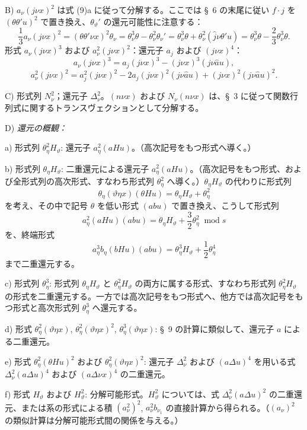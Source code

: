 \documentclass[11pt]{jlreq}
\newcommand{\A}{\Delta}
\newcommand{\modu}[1]{\;\operatorname{mod} #1}
\begin{document}
\noindent B) $a_\nu(j\nu x)^2$ は式 (9)a に従って分解する。ここでは \S\ 6 の末尾に従い $f\cdot j$ を $(\theta\theta'u)^2$ で置き換え、$\theta_\vartheta'$ の還元可能性に注意する：
\[
\frac13a_\nu(j\nu x)^2=(\theta\theta'\nu x)^2\theta_\nu
=\theta_\nu^3\theta-\theta_\nu^2\theta_\nu'
=\theta_\nu^3\theta+\theta_\nu^2(\widehat{j}\nu\theta'u)
=\theta_\nu^3\theta-\frac23\theta_\nu^3\theta.
\]
形式 $a_\nu(j\nu x)^3$ および $a_\nu^2(j\nu x)^2$：還元子 $a_j$ および $(j\nu x)^4$：
\[
a_\nu(j\nu x)^3=a_j(j\nu x)^3-(j\nu x)^3(j\nu\widehat{a}u),
\]
\[
a_\nu^2(j\nu x)^2=a_j^2(j\nu x)^2-2a_j(j\nu x)^2(j\nu\widehat{a}u)+(j\nu x)^2(j\nu\widehat{a}u)^2.
\]

\noindent C) 形式列 $N_\nu^2$；還元子 $\A_\nu^2$。$(n\nu x)$ および $N_\nu(n\nu x)$ は、\S\ 3 に従って関数行列式に関するトランスヴェクションとして分解する。

\noindent D) \emph{還元の概観：}

a) 形式列 $\theta_\eta^2H_\vartheta$: 還元子 $a_\eta^2(aHu)$。（高次記号をもつ形式へ導く。）

b) 形式列 $\theta_\eta H_\vartheta$: 二重還元による還元子 $a_\eta^2(aHu)$。（高次記号をもつ形式、および全形式列の高次形式、すなわち形式列 $\theta_\eta^2$ へ導く。）$\theta_\eta H_\vartheta$ の代わりに形式列
\[
\theta_\eta(\vartheta\eta x)(\theta Hu)=\theta_\eta H_\vartheta+\theta_\eta^2
\]
を考え、その中で記号 $\theta$ を低い形式 $(abu)$ で置き換え、こうして形式列
\[
a_\eta^2(aHu)(abu)=\theta_\eta H_\vartheta+\frac32\theta_\eta^2\modu{s}
\]
を、終端形式
\[
a_\eta^3b_\eta(bHu)(abu)=\theta_\eta^3H_\vartheta+\frac12\theta_\eta^4
\]
まで二重還元する。

c) 形式列 $\theta_\eta^3$: 形式列 $\theta_\eta H_\vartheta$ と $\theta_\eta^2H_\vartheta$ の両方に属する形式、すなわち形式列 $\theta_\eta^2H_\vartheta$ の形式を二重還元する。一方では高次記号をもつ形式へ、他方では高次記号をもつ形式と高次形式列 $\theta_\eta^3$ へ還元する。

d) 形式 $\theta_\eta^2(\vartheta\eta x)$, $\theta_\eta^2(\vartheta\eta x)^2$, $\theta_\eta^3(\vartheta\eta x)$: \S\ 9 の計算に類似して、還元子 $a$ による二重還元。

e) 形式 $\theta_\eta^2(\theta Hu)^2$ および $\theta_\eta^2(\vartheta\eta x)^2$: 還元子 $\A_\nu^2$ および $(a\A u)^4$ を用いる式 $\A_\nu^2(a\A u)^4$ および $(a\A\nu x)^4$ の二重還元。

f) 形式 $H_\vartheta$ および $H_\vartheta^2$: 分解可能形式。$H_\vartheta^2$ については、式 $\A_\nu^2(a\A u)^2$ の二重還元、または系の形式による積 $(a_\nu^2)^2$, $a_\nu^2b_{\nu_1}$ の直接計算から得られる。（$(a_\nu)^2$ の類似計算は分解可能形式間の関係を与える。）
\end{document}

